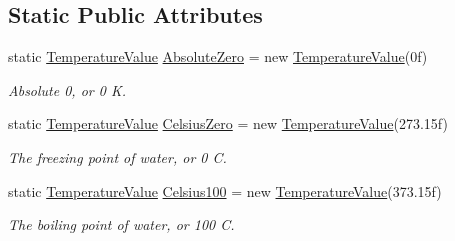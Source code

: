 \subsection*{Static Public Attributes}
\begin{DoxyCompactItemize}
\item 
static \hyperlink{struct_temperature_value}{Temperature\+Value} \hyperlink{struct_temperature_value_a4281a7b4ca1196b7282db630909c810c}{Absolute\+Zero} = new \hyperlink{struct_temperature_value}{Temperature\+Value}(0f)
\begin{DoxyCompactList}\small\item\em Absolute 0, or 0 K. \end{DoxyCompactList}\item 
static \hyperlink{struct_temperature_value}{Temperature\+Value} \hyperlink{struct_temperature_value_af396a3d096a2b78c7669976a6bf38d16}{Celsius\+Zero} = new \hyperlink{struct_temperature_value}{Temperature\+Value}(273.\+15f)
\begin{DoxyCompactList}\small\item\em The freezing point of water, or 0 C. \end{DoxyCompactList}\item 
static \hyperlink{struct_temperature_value}{Temperature\+Value} \hyperlink{struct_temperature_value_a11cdb28b1792fe73588f3fd75b790c98}{Celsius100} = new \hyperlink{struct_temperature_value}{Temperature\+Value}(373.\+15f)
\begin{DoxyCompactList}\small\item\em The boiling point of water, or 100 C. \end{DoxyCompactList}\end{DoxyCompactItemize}
